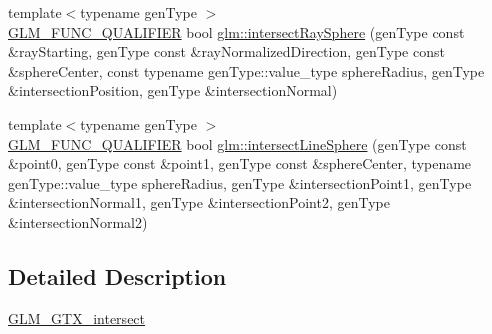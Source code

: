 \begin{DoxyCompactItemize}
\item 
{\footnotesize template$<$typename gen\+Type $>$ }\\\mbox{\hyperlink{setup_8hpp_a33fdea6f91c5f834105f7415e2a64407}{G\+L\+M\+\_\+\+F\+U\+N\+C\+\_\+\+Q\+U\+A\+L\+I\+F\+I\+ER}} bool \mbox{\hyperlink{group__gtx__intersect_gad28c00515b823b579c608aafa1100c1d}{glm\+::intersect\+Ray\+Sphere}} (gen\+Type const \&ray\+Starting, gen\+Type const \&ray\+Normalized\+Direction, gen\+Type const \&sphere\+Center, const typename gen\+Type\+::value\+\_\+type sphere\+Radius, gen\+Type \&intersection\+Position, gen\+Type \&intersection\+Normal)
\item 
{\footnotesize template$<$typename gen\+Type $>$ }\\\mbox{\hyperlink{setup_8hpp_a33fdea6f91c5f834105f7415e2a64407}{G\+L\+M\+\_\+\+F\+U\+N\+C\+\_\+\+Q\+U\+A\+L\+I\+F\+I\+ER}} bool \mbox{\hyperlink{group__gtx__intersect_ga9c68139f3d8a4f3d7fe45f9dbc0de5b7}{glm\+::intersect\+Line\+Sphere}} (gen\+Type const \&point0, gen\+Type const \&point1, gen\+Type const \&sphere\+Center, typename gen\+Type\+::value\+\_\+type sphere\+Radius, gen\+Type \&intersection\+Point1, gen\+Type \&intersection\+Normal1, gen\+Type \&intersection\+Point2, gen\+Type \&intersection\+Normal2)
\end{DoxyCompactItemize}


\subsection{Detailed Description}
\mbox{\hyperlink{group__gtx__intersect}{G\+L\+M\+\_\+\+G\+T\+X\+\_\+intersect}} 